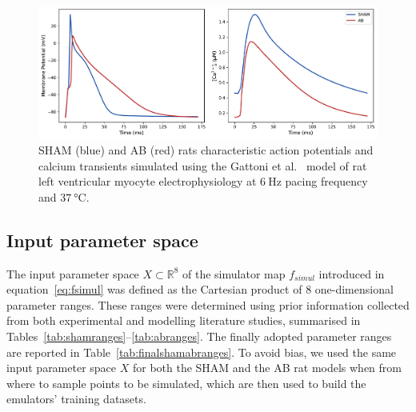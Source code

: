 \begin{figure}[!ht]
    \myfloatalign
    \includegraphics[width=\textwidth]{figures/chapter02/sham_vs_ab_ca_ap.pdf}
    \caption{SHAM (blue) and AB (red) rats characteristic action potentials and calcium transients simulated using the Gattoni et al.~\cite{Gattoni:2017} model of rat left ventricular myocyte electrophysiology at $\SI{6}{\hertz}$ pacing frequency and $\SI{37}{\celsius}$.}
    \label{fig:shamvsabcaap}
\end{figure}


%
%
%
\subsection{Input parameter space}
The input parameter space $X\subset\mathbb{R}^{8}$ of the simulator map $f_{simul}$ introduced in equation~\eqref{eq:fsimul} was defined as the Cartesian product of $8$ one-dimensional parameter ranges. These ranges were determined using prior information collected from both experimental and modelling literature studies, summarised in Tables~\ref{tab:shamranges}--\ref{tab:abranges}. The finally adopted parameter ranges are reported in Table~\ref{tab:finalshamabranges}. To avoid bias, we used the same input parameter space $X$ for both the SHAM and the AB rat models when from where to sample points to be simulated, which are then used to build the emulators' training datasets.

